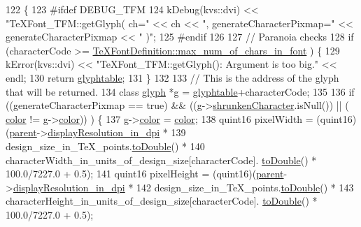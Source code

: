 \begin{DoxyCode}
122 \{
123 \textcolor{preprocessor}{#ifdef DEBUG\_TFM}
124   kDebug(kvs::dvi) << \textcolor{stringliteral}{"TeXFont\_TFM::getGlyph( ch="} << ch << \textcolor{stringliteral}{", generateCharacterPixmap="} << 
      generateCharacterPixmap << \textcolor{stringliteral}{" )"};
125 \textcolor{preprocessor}{#endif}
126 
127   \textcolor{comment}{// Paranoia checks}
128   \textcolor{keywordflow}{if} (characterCode >= \hyperlink{classTeXFontDefinition_a542c448736e5c591257ac3889f047d66}{TeXFontDefinition::max\_num\_of\_chars\_in\_font}
      ) \{
129     kError(kvs::dvi) << \textcolor{stringliteral}{"TeXFont\_TFM::getGlyph(): Argument is too big."} << endl;
130     \textcolor{keywordflow}{return} \hyperlink{classTeXFont_a4ec465c9b189f0845a25ad5c99903e5f}{glyphtable};
131   \}
132 
133   \textcolor{comment}{// This is the address of the glyph that will be returned.}
134   \textcolor{keyword}{class }\hyperlink{classglyph}{glyph} *g = \hyperlink{classTeXFont_a4ec465c9b189f0845a25ad5c99903e5f}{glyphtable}+characterCode;
135 
136   \textcolor{keywordflow}{if} ((generateCharacterPixmap == \textcolor{keyword}{true}) && ((g->\hyperlink{classglyph_aeefa28a926bdd7a24595dbdc7cdf504c}{shrunkenCharacter}.isNull()) || (
      \hyperlink{classglyph_ab4847af7a7b13322d5651fe47735c8dd}{color} != g->\hyperlink{classglyph_ab4847af7a7b13322d5651fe47735c8dd}{color})) ) \{
137     g->\hyperlink{classglyph_ab4847af7a7b13322d5651fe47735c8dd}{color} = \hyperlink{classglyph_ab4847af7a7b13322d5651fe47735c8dd}{color};
138     quint16 pixelWidth = (quint16)(\hyperlink{classTeXFont_a72d8eb1f0377749cf4a45dfabf1c3dd5}{parent}->\hyperlink{classTeXFontDefinition_a08e27df7d9764c43308c5637906658c5}{displayResolution\_in\_dpi} *
139                                      design\_size\_in\_TeX\_points.\hyperlink{classfix__word_a6d960fb9bf343763b687a04cc3af1215}{toDouble}() *
140                                      characterWidth\_in\_units\_of\_design\_size[characterCode].
      \hyperlink{classfix__word_a6d960fb9bf343763b687a04cc3af1215}{toDouble}() * 100.0/7227.0 + 0.5);
141     quint16 pixelHeight = (quint16)(\hyperlink{classTeXFont_a72d8eb1f0377749cf4a45dfabf1c3dd5}{parent}->\hyperlink{classTeXFontDefinition_a08e27df7d9764c43308c5637906658c5}{displayResolution\_in\_dpi} *
142                                       design\_size\_in\_TeX\_points.\hyperlink{classfix__word_a6d960fb9bf343763b687a04cc3af1215}{toDouble}() *
143                                       characterHeight\_in\_units\_of\_design\_size[characterCode].
      \hyperlink{classfix__word_a6d960fb9bf343763b687a04cc3af1215}{toDouble}() * 100.0/7227.0 + 0.5);

\end{DoxyCode}
